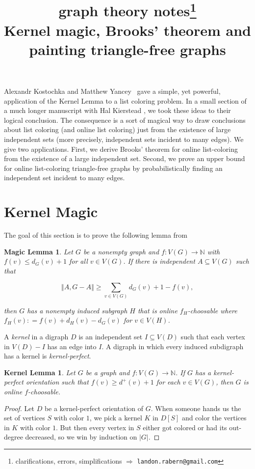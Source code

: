 \documentclass[12pt]{article}
\title{graph theory notes\thanks{clarifications, errors, simplifications $\Rightarrow$ \texttt{landon.rabern@gmail.com}}\\ \bigskip
Kernel magic, Brooks' theorem and painting triangle-free graphs}
\date{}
\theoremstyle{plain}
\newtheorem*{KernelLemma}{Kernel Lemma}
\newtheorem*{MagicLemma}{Magic Lemma}
\theoremstyle{definition}
\theoremstyle{remark}
\newcommand{\IN}{\mathbb{N}}
\newcommand{\size}[1]{\left\Vert#1\right\Vert}
\newcommand{\func}[3]{#1\colon #2 \rightarrow #3}
\newcommand{\DefinedAs}{\mathrel{\mathop:}=}
\begin{document}
\maketitle

Alexandr Kostochka and Matthew Yancey~\cite{kostochkayancey2012ore} gave a simple, yet
powerful, application of the Kernel Lemma to a list coloring problem.  
In a small section of a much longer manuscript with Hal Kierstead \cite{orevizing}, we took these ideas to their logical conclusion.  
The consequence is a sort of magical way to draw conclusions about list coloring (and online list coloring) just from the existence of large independent sets (more precisely, independent sets incident to many edges).
We give two applications. First, we derive Brooks' theorem for online list-coloring from the existence of a large independent set.  Second, we prove an upper bound for online list-coloring triangle-free graphs by probabilistically finding an independent set
incident to many edges.

\section{Kernel Magic}
The goal of this section is to prove the following lemma from \cite{orevizing}

\begin{MagicLemma}
	Let $G$ be a nonempty graph and $\func{f}{V(G)}{\IN}$ with $f(v) \le d_G(v) + 1$ for all $v \in V(G)$. If there is independent $A \subseteq V(G)$ such that
	
	\[\size{A, G-A} \ge  \sum_{v \in V(G)} d_G(v) + 1 - f(v),\]
	
	\noindent then $G$ has a nonempty induced subgraph $H$ that is online $f_H$-choosable where $f_H(v) \DefinedAs f(v) + d_H(v) - d_G(v)$ for $v \in V(H)$.
\end{MagicLemma}

A \emph{kernel} in a digraph $D$ is an independent set $I \subseteq V(D)$ such
that each vertex in $V(D) - I$ has an edge into $I$.  A digraph in which every
induced subdigraph has a kernel is \emph{kernel-perfect}.

\begin{KernelLemma}
	Let $G$ be a graph and $\func{f}{V(G)}{\IN}$. If $G$ has a kernel-perfect orientation such that $f(v) \geq d^+(v) + 1$ for each $v \in V(G)$, then $G$ is online $f$-choosable.
\end{KernelLemma}
\begin{proof}
	Let $D$ be a kernel-perfect orientation of $G$.  
	When someone hands us the set of vertices $S$ with color $1$, we pick a kernel $K$ in $D[S]$ and color the vertices in $K$ with color $1$.  
	But then every vertex in $S$ either got colored or had its out-degree decreased, so we win by induction on $|G|$.
\end{proof}
\end{document}
